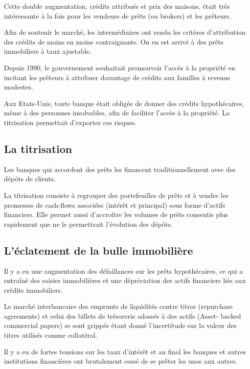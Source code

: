 	Cette double augmentation, crédits attribués et prix des maisons, était très intéressante à la fois pour les vendeurs de prêts (ou brokers) et les prêteurs. 

	Afin de soutenir le marché, les intermédiaires ont rendu les critères 
d'attribution des crédits de moins en moins contraignants. On en est arrivé à des prêts immobiliers à taux ajustable.

	Depuis 1990, le gouvernement souhaitait promouvoir l'accès à la propriété en incitant les prêteurs à attribuer davantage de crédits aux familles à revenus modestes.

	Aux Etats-Unis, toute banque était obligée de donner des crédits hypothécaires, même à des personnes insolvables, afin de faciliter l'accès à la propriété. La titrisation permettait d'exporter ces risques.
	
	\subsection{La titrisation}
	
	Les banques qui accordent des prêts les financent 
traditionnellement avec des dépôts de clients. 

	La titrisation consiste à regrouper des portefeuilles de prêts et à vendre les promesses de cash-flows associées (intérêt et principal) sous forme d'actifs financiers. Elle permet aussi d'accroître les volumes de prêts consentis plus rapidement que ne le permettrait l'évolution des dépôts. 
	
	\subsection{L'éclatement de la bulle immobilière}
	
	Il y a eu une augmentation des défaillances sur les prêts hypothécaires, ce qui a entraîné des saisies immobilières et une dépréciation des actifs financiers liés aux crédits immobiliers.
	
	Le marché interbancaire des emprunts de liquidités contre titres 
(repurchase agreements) et celui des billets de trésorerie adossés à des actifs (Asset- backed commercial papers) se sont grippés étant donné l'incertitude sur la valeur des titres utilisés comme collatéral. 

	Il y a eu de fortes tensions sur les taux d'intérêt et au final les banques et autres institutions financières ont brutalement cessé de se 
prêter les unes aux autres.
	
